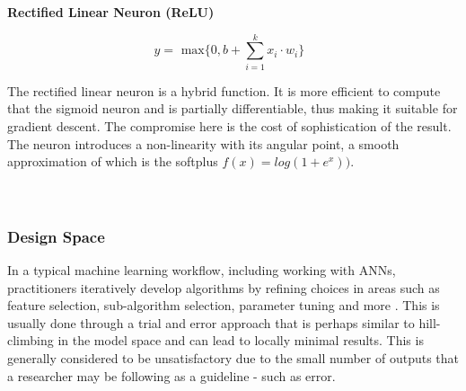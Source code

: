 \documentclass[a4paper,11pt,titlepage]{article}
\begin{document}
		\begin{figure}[H]
    			\centering	
    			\qquad
    			\qquad
    			\caption{}%
    			\label{fig:SigmoidNeurons}
		\end{figure}

		\textbf{Rectified Linear Neuron (ReLU) }
		
		$$
		y = 
		\text{ max$\{0,  b + \sum\limits_{i=1}^k x_{i} \cdot w_{i}\}$ }	
		$$		
		
		The rectified linear neuron is a hybrid function. It is more efficient to compute that the sigmoid neuron and is partially differentiable, thus making it suitable for gradient descent. The compromise here is the cost of sophistication of the result. The neuron introduces a non-linearity with its angular point, a smooth approximation of which is the softplus $f(x) = log(1 + e^{x}))$.
\\\
\\\

\subsubsection{Design Space}
		In a typical machine learning workflow, including working with ANNs, practitioners iteratively develop algorithms by refining choices in areas such as feature selection, sub-algorithm selection, parameter tuning and more \cite{Patel2008}. This is usually done through a trial and error approach that is perhaps similar to hill-climbing in the model space and can lead to locally minimal results. This is generally considered to be unsatisfactory due to the small number of outputs that a researcher may be following as a guideline - such as error.
						
\end{document}
